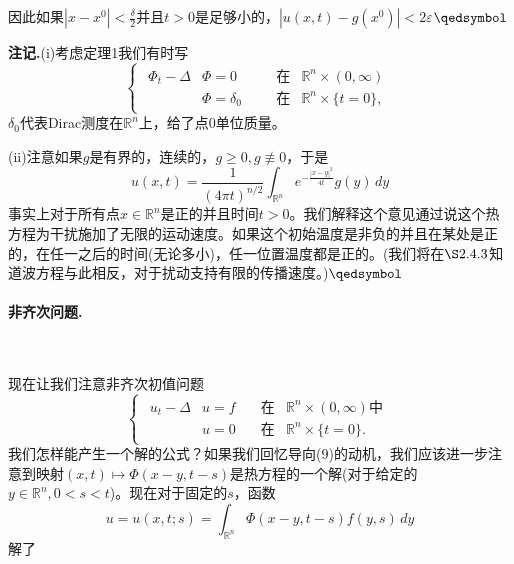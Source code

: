 \documentclass[leqno]{article}
\numberwithin{equation}{subsection}%
\begin{document}
因此如果$|x-x^{0}|<\frac{\delta}{2}$并且$t>0$是足够小的，$|u(x,t)-g(x^{0})|<2\varepsilon$$\hfill\qedsymbol$
\par
\noindent\textbf{注记.}(i)考虑定理1我们有时写
\begin{equation*}
\begin{cases}
\begin{aligned}
\Phi_{t}-\Delta &\Phi=0\qquad&\text{在}&\mathbb{R}^{n}\times(0,\infty)\\
&\Phi=\delta_{0}&\text{在}&\mathbb{R}^{n}\times\{t=0\},
\end{aligned}
\end{cases}
\end{equation*}
$\delta_{0}$代表Dirac测度在$\mathbb{R}^{n}$上，给了点0单位质量。
\par
(ii)注意如果$g$是有界的，连续的，$g\geq 0,g\not\equiv 0$，于是
\begin{equation*}
	u(x,t)=\frac{1}{(4\pi t)^{n/2}}\int_{\mathbb{R}^{n}}e^{-\frac{|x-y|^{2}}{4t}}g(y)\,dy
\end{equation*}
事实上对于所有点$x\in\mathbb{R}^{n}$是正的并且时间$t>0$。我们解释这个意见通过说这个热方程为干扰施加了无限的运动速度。如果这个初始温度是非负的并且在某处是正的，在任一之后的时间(无论多小)，任一位置温度都是正的。(我们将在$\S 2.4.3$知道波方程与此相反，对于扰动支持有限的传播速度。)$\hfill\qedsymbol$



\paragraph{非齐次问题.}~{}
\par
现在让我们注意非齐次初值问题
\begin{equation}
\begin{cases}
\begin{aligned}
u_{t}-\Delta &u=f\quad&\text{在}&\mathbb{R}^{n}\times(0,\infty)\text{中}\\
&u=0&\text{在}&\mathbb{R}^{n}\times\{t=0\}.
\end{aligned}
\end{cases}
\end{equation}
我们怎样能产生一个解的公式？如果我们回忆导向(9)的动机，我们应该进一步注意到映射$(x,t)\mapsto \Phi(x-y,t-s)$是热方程的一个解(对于给定的$y\in\mathbb{R}^{n},0<s<t$)。现在对于固定的$s$，函数
\begin{equation*}
u=u(x,t;s)=\int_{\mathbb{R}^{n}}\Phi(x-y,t-s)f(y,s)\,dy
\end{equation*}
解了
\end{document}
